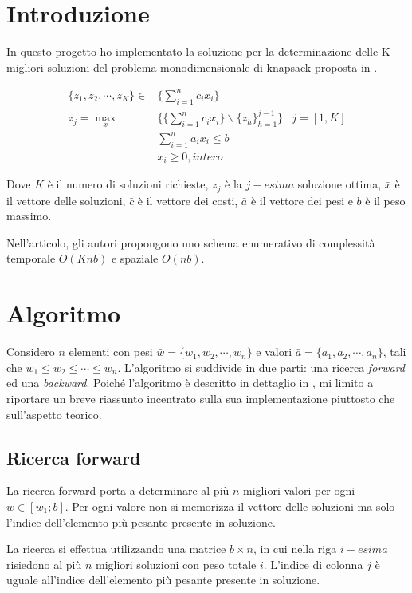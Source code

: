 \section{Introduzione}

In questo progetto ho implementato la soluzione per la determinazione delle K
migliori soluzioni del problema monodimensionale di knapsack proposta in
\cite{YANASSE2000}.

\begin{align*}
  \{z_1,z_2,\cdots,z_K\} \in & \{\sum\limits_{i=1}^n c_ix_i\}\\
  z_j = \max\limits_x & \{\{\sum\limits_{i=1}^n c_ix_i\}\backslash\{z_h\}_{h=1}^{j-1}\}& j = [1,K]\\
%
  &\sum\limits_{i=1}^n a_ix_i \le b\\
  &x_i\ge0, intero
\end{align*}

Dove $K$ è il numero di soluzioni richieste, $z_j$ è la $j-esima$ soluzione
ottima, $\bar{x}$ è il vettore delle soluzioni, $\bar{c}$ è il vettore dei
costi, $\bar{a}$ è il vettore dei pesi e $b$ è il peso massimo.

Nell'articolo, gli autori propongono uno schema enumerativo di complessità
temporale $O(Knb)$ e spaziale $O(nb)$.

\section{Algoritmo}

Considero $n$ elementi con pesi $\bar{w}=\{w_1, w_2, \cdots, w_n\}$ e valori
$\bar{a}=\{a_1, a_2, \cdots,a_n\}$, tali che $w_1 \le w_2 \le \cdots \le w_n$.
L'algoritmo si suddivide in due parti: una ricerca \emph{forward} ed una
\emph{backward}. Poich\'e l'algoritmo è descritto in dettaglio in
\cite{YANASSE2000}, mi limito a riportare un breve riassunto incentrato sulla
sua implementazione piuttosto che sull'aspetto teorico.

\subsection{Ricerca forward}

La ricerca forward porta a determinare al più $n$ migliori
valori per ogni $w \in [w_1;b]$. Per ogni valore non si memorizza il vettore
delle soluzioni ma solo l'indice dell'elemento più pesante presente in
soluzione.

La ricerca si effettua utilizzando una matrice $b\times{}n$, in cui nella riga
$i-esima$ risiedono al più $n$ migliori soluzioni con peso totale $i$.
L'indice di colonna $j$ è uguale all'indice dell'elemento più pesante presente
in soluzione.

